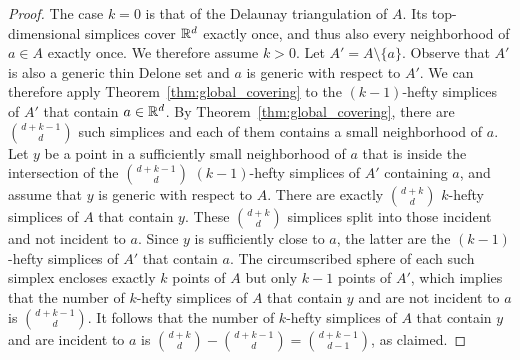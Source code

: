 \documentclass[a4paper,UKenglish,cleveref, autoref,numberwithinsect]{socg-lipics-v2021}
\newcommand {\mm}[1] {\ifmmode{#1}\else{\mbox{\(#1\)}}\fi}
\theoremstyle{plain}
\newcommand{\Rspace}        {\mm{{\mathbb R}}}
\begin{document}
\begin{proof}
  The case $k=0$ is that of the Delaunay triangulation of $A$.
  Its top-dimensional simplices cover $\Rspace^d$ exactly once, and thus also every neighborhood of $a \in A$ exactly once.
  We therefore assume $k > 0$. 
  Let $A' = A \setminus \{a\}$.
  Observe that $A'$ is also a generic thin Delone set and $a$ is generic with respect to $A'$.
  We can therefore apply Theorem~\ref{thm:global_covering} to the $(k-1)$-hefty simplices of $A'$ that contain $a \in \Rspace^d$.
  By Theorem~\ref{thm:global_covering}, there are $\binom{d+k-1}{d}$ such simplices and each of them contains a small neighborhood of $a$.
  \smallskip
  Let $y$ be a point in a sufficiently small neighborhood of $a$ that is inside the intersection of the $\binom{d+k-1}{d}$ $(k-1)$-hefty simplices of $A'$ containing $a$, and assume that $y$ is generic with respect to $A$.
  There are exactly $\binom{d+k}{d}$ $k$-hefty simplices of $A$ that contain $y$.
  These $\binom{d+k}{d}$ simplices split into those incident and not incident to $a$.
  Since $y$ is sufficiently close to $a$, the latter are the $(k-1)$-hefty simplices of $A'$ that contain $a$.
  The circumscribed sphere of each such simplex encloses exactly $k$ points of $A$ but only $k-1$ points of $A'$, which implies that the number of $k$-hefty simplices of $A$ that contain $y$ and are not incident to $a$ is $\binom{d+k-1}{d}$.
  It follows that the number of $k$-hefty simplices of $A$ that contain $y$ and are incident to $a$ is $\binom{d+k}{d}-\binom{d+k-1}{d}=\binom{d+k-1}{d-1}$, as claimed.
\end{proof}
\end{document}
